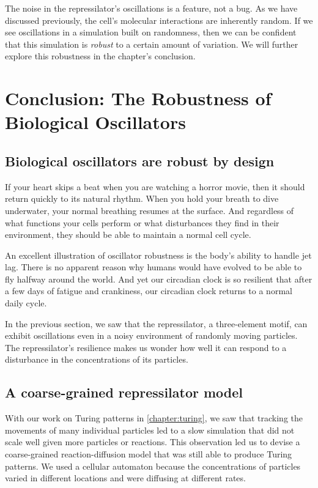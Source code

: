 The noise in the repressilator's oscillations is a feature, not a bug. As we have discussed previously, the cell's molecular interactions are inherently random. If we see oscillations in a simulation built on randomness, then we can be confident that this simulation is \textit{robust} to a certain amount of variation. We will further explore this robustness in the chapter's conclusion.\\

\FloatBarrier
{}

\section{Conclusion: The Robustness of Biological Oscillators}
\label{sec:biological_oscillators_must_be_robust}

\subsection{Biological oscillators are robust by design}

If your heart skips a beat when you are watching a horror movie, then it should return quickly to its natural rhythm. When you hold your breath to dive underwater, your normal breathing resumes at the surface. And regardless of what functions your cells perform or what disturbances they find in their environment, they should be able to maintain a normal cell cycle.

An excellent illustration of oscillator robustness is the body's ability to handle jet lag. There is no apparent reason why humans would have evolved to be able to fly halfway around the world. And yet our circadian clock is so resilient that after a few days of fatigue and crankiness, our circadian clock returns to a normal daily cycle.

In the previous section, we saw that the repressilator, a three-element motif, can exhibit oscillations even in a noisy environment of randomly moving particles. The repressilator's resilience makes us wonder how well it can respond to a disturbance in the concentrations of its particles.

\FloatBarrier
{}
\subsection{A coarse-grained repressilator model}

With our work on Turing patterns in \autoref{chapter:turing}, we saw that tracking the movements of many individual particles led to a slow simulation that did not scale well given more particles or reactions. This observation led us to devise a coarse-grained reaction-diffusion model that was still able to produce Turing patterns. We used a cellular automaton because the concentrations of particles varied in different locations and were diffusing at different rates.

